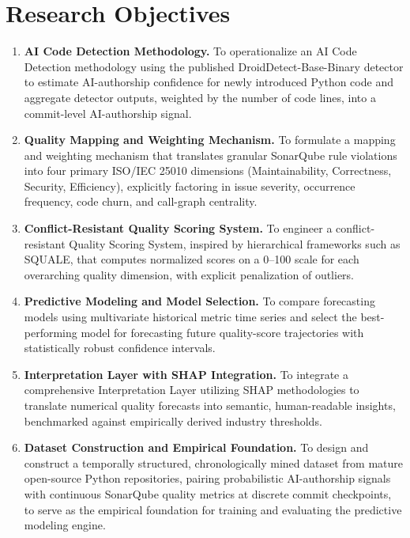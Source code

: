 \documentclass[12pt,a4paper,oneside]{report}
\begin{document}
\section{Research Objectives}
\begin{enumerate}[leftmargin=*,label=\textbf{\arabic*.}]
    \item \textbf{AI Code Detection Methodology.} To operationalize an AI Code Detection methodology using the published DroidDetect-Base-Binary detector to estimate AI-authorship confidence for newly introduced Python code and aggregate detector outputs, weighted by the number of code lines, into a commit-level AI-authorship signal.

    \item \textbf{Quality Mapping and Weighting Mechanism.} To formulate a mapping and weighting mechanism that translates granular SonarQube rule violations into four primary ISO/IEC 25010 dimensions (Maintainability, Correctness, Security, Efficiency), explicitly factoring in issue severity, occurrence frequency, code churn, and call-graph centrality.

    \item \textbf{Conflict-Resistant Quality Scoring System.} To engineer a conflict-resistant Quality Scoring System, inspired by hierarchical frameworks such as SQUALE, that computes normalized scores on a 0--100 scale for each overarching quality dimension, with explicit penalization of outliers.

    \item \textbf{Predictive Modeling and Model Selection.} To compare forecasting models using multivariate historical metric time series and select the best-performing model for forecasting future quality-score trajectories with statistically robust confidence intervals.

    \item \textbf{Interpretation Layer with SHAP Integration.} To integrate a comprehensive Interpretation Layer utilizing SHAP methodologies to translate numerical quality forecasts into semantic, human-readable insights, benchmarked against empirically derived industry thresholds.

    \item \textbf{Dataset Construction and Empirical Foundation.} To design and construct a temporally structured, chronologically mined dataset from mature open-source Python repositories, pairing probabilistic AI-authorship signals with continuous SonarQube quality metrics at discrete commit checkpoints, to serve as the empirical foundation for training and evaluating the predictive modeling engine.
\end{enumerate}
\end{document}

